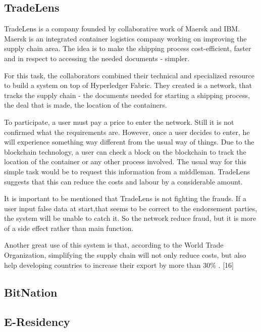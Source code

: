 \documentclass[a4paper,11pt]{report}
\begin{document}
\subsection{TradeLens}
\label{tradelens}

	TradeLens is a company founded by collaborative work of Maersk and IBM. Maersk is an integrated container logistics company working on improving the supply chain area. The idea is to make the shipping process cost-efficient, faster and in respect to accessing the needed documents - simpler.
	 
	For this task, the collaborators combined their technical and specialized resource to build a system on top of Hyperledger Fabric. They created is a network, that tracks the supply chain - the documents needed for starting a shipping process, the deal that is made, the location of the containers.
	 
	To participate, a user must pay a price to enter the network. Still it is not confirmed what the requirements are. However, once a user decides to enter, he will experience something way different from the usual way of things. Due to the blockchain technology, a user can check a block on the blockchain to track the location of the container or any other process involved. The usual way for this simple task would be to request this information from a middleman. TradeLens suggests that this can reduce the costs and labour by a considerable amount. \cite{tradeLensFounders}
	
	It is important to be mentioned that TradeLens is not fighting the frauds. If a user input false data at start,that seems to be correct to the endorsement parties, the system will be unable to catch it. So the network reduce fraud, but it is more of a side effect rather than main function.
	
	Another great use of this system is that, according to the World Trade Organization, simplifying the supply chain will not only reduce costs, but also help developing countries to increase their export by more than 30\% . [16]
	
\subsection{BitNation}
\label{bitnation}


\subsection{E-Residency}
\label{eResidency}
\end{document}
